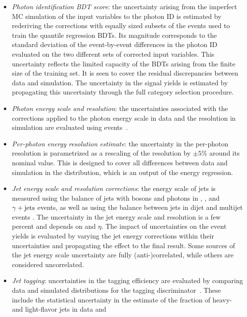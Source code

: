 \documentclass[11pt,twoside,a4paper,cmspaper,final,collab]{cms-tdr}
\begin{document}
\begin{itemize}
\item \textit{Photon identification BDT score}:
  the uncertainty arising from the imperfect MC simulation of the input variables to the photon ID 
  is estimated by rederiving the corrections with equally sized subsets 
of the \Zee events used to train the quantile regression BDTs. Its magnitude corresponds to the standard deviation of the event-by-event differences in the photon ID evaluated on the two different sets of corrected input variables.
This uncertainty reflects the limited capacity of the BDTs 
arising from the finite size of the training set. It is seen to cover the residual discrepancies between data and simulation. 
  The uncertainty in the signal yields is
  estimated by propagating this uncertainty through the full category selection procedure.
\item \textit{Photon energy scale and resolution}: 
  the uncertainties associated with the corrections applied to the photon energy scale in data
  and the resolution in simulation are evaluated using \Zee events~\cite{Khachatryan:2015iwa}.
\item \textit{Per-photon energy resolution estimate}: 
  the uncertainty in the per-photon resolution is
  parametrized as a rescaling of the resolution by
  $\pm 5\%$ around its nominal value. 
  This is designed to cover all differences between data and simulation 
  in the distribution, which is an output of the energy regression.
\item \textit{Jet energy scale and resolution corrections}: 
  the energy scale of jets is measured using the \pt balance of jets with \PZ bosons and photons in
  \Zee, \Zmumu, and $\gamma+\text{jets}$ events, as well as using the \pt balance between jets 
  in dijet and multijet events \cite{JetsInRun2,Khachatryan:2016kdb}. The uncertainty in the jet energy scale and resolution
  is a few percent and depends on \pt and $\eta$. The impact of uncertainties on the event yields is evaluated by varying the jet energy corrections within their uncertainties and 
  propagating the effect to the final result. Some sources of the jet energy scale uncertainty are fully (anti-)correlated, while others are considered uncorrelated.
\item \textit{Jet {\cPqb} tagging}: 
  uncertainties in the {\cPqb} tagging efficiency are evaluated 
  by comparing data and simulated distributions for the {\cPqb} tagging
  discriminator~\cite{CMSbtagging}. These include the statistical uncertainty in the
estimate of the fraction of heavy- and light-flavor jets in data and

\end{itemize}
\end{document}
